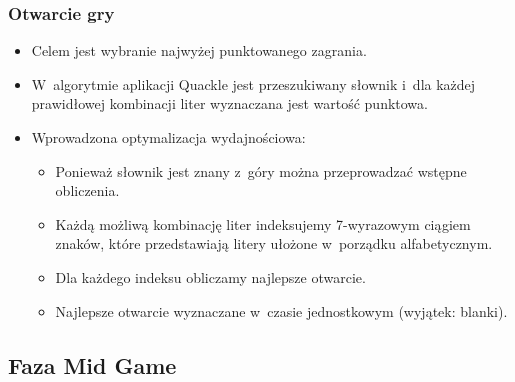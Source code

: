 \documentclass[10pt,a4paper]{beamer}
\begin{document}
\begin{frame}
	\frametitle{Otwarcie gry}

	\begin{itemize}
		\item Celem jest wybranie najwyżej punktowanego zagrania.
		\item W~algorytmie aplikacji Quackle jest przeszukiwany słownik i~dla każdej prawidłowej kombinacji liter wyznaczana jest wartość punktowa.
		\item Wprowadzona optymalizacja wydajnościowa:
			\begin{itemize}
				\item Ponieważ słownik jest znany z~góry można przeprowadzać wstępne obliczenia.
				\item Każdą możliwą kombinację liter indeksujemy 7-wyrazowym ciągiem znaków, które przedstawiają litery ułożone w~porządku alfabetycznym.
				\item Dla każdego indeksu obliczamy najlepsze otwarcie.
				\item Najlepsze otwarcie wyznaczane w~czasie jednostkowym (wyjątek: blanki).
			\end{itemize}
	\end{itemize}
\end{frame}

\subsection{Faza Mid Game}
\captionsetup[figure]{skip=2pt}
\end{document}
